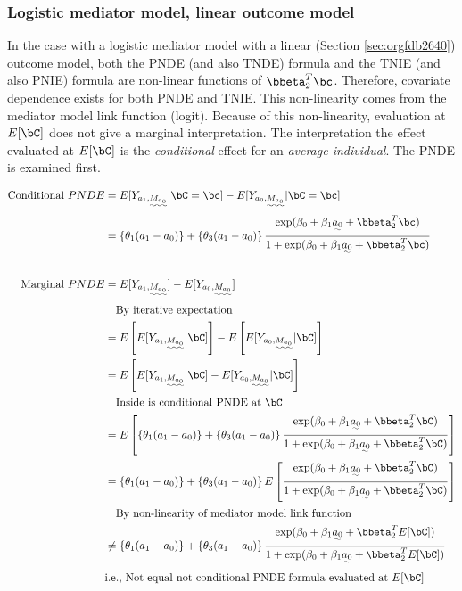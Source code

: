 \documentclass[dvipdfmx,10pt]{article}
\begin{document}
\subsubsection{Logistic mediator model, linear outcome model}
\label{sec:orgb8606b5}
In the case with a logistic mediator model with a linear (Section \ref{sec:orgfdb2640}) outcome model, both the PNDE (and also TNDE) formula and the TNIE (and also PNIE) formula are non-linear functions of \(\bbeta_{2}^{T}\bc\). Therefore, covariate dependence exists for both PNDE and TNIE. This non-linearity comes from the mediator model link function (logit). Because of this non-linearity, evaluation at \(E[\bC]\) does not give a marginal interpretation. The interpretation the effect evaluated at \(E[\bC]\) is the \emph{conditional} effect for an \emph{average individual}. The PNDE is examined first.

\begin{align*}
  \text{Conditional }PNDE
  &= E[Y_{a_{1},\uwave{M_{a_{0}}}} | \bC = \bc] - E[Y_{a_{0},\uwave{M_{a_{0}}}} | \bC = \bc]\\
  &= \left\{\theta_{1}(a_{1} - a_{0}) \right\} + \left\{\theta_{3}(a_{1} - a_{0}) \right\}
    \frac
    {    \exp(\beta_{0} + \beta_{1}\uwave{a_{0}} + \bbeta_{2}^{T}\bc)}
    {1 + \exp(\beta_{0} + \beta_{1}\uwave{a_{0}} + \bbeta_{2}^{T}\bc)}\\
  \\
  \text{Marginal }PNDE
  &= E[Y_{a_{1},\uwave{M_{a_{0}}}}] - E[Y_{a_{0},\uwave{M_{a_{0}}}}]\\
  &~~~\text{By iterative expectation}\\
  &= E \left[ E[Y_{a_{1},\uwave{M_{a_{0}}}} | \bC] \right] - E \left[ E[Y_{a_{0},\uwave{M_{a_{0}}}} | \bC] \right]\\
  &= E \left[ E[Y_{a_{1},\uwave{M_{a_{0}}}} | \bC] - E[Y_{a_{0},\uwave{M_{a_{0}}}} | \bC] \right]\\
  &~~~\text{Inside is conditional PNDE at }\bC\\
  &= E \left[ \left\{\theta_{1}(a_{1} - a_{0}) \right\} + \left\{\theta_{3}(a_{1} - a_{0}) \right\}
    \frac
    {    \exp(\beta_{0} + \beta_{1}\uwave{a_{0}} + \bbeta_{2}^{T}\bC)}
    {1 + \exp(\beta_{0} + \beta_{1}\uwave{a_{0}} + \bbeta_{2}^{T}\bC)} \right]\\
  &= \left\{\theta_{1}(a_{1} - a_{0}) \right\} + \left\{\theta_{3}(a_{1} - a_{0}) \right\}
    E \left[ \frac
    {    \exp(\beta_{0} + \beta_{1}\uwave{a_{0}} + \bbeta_{2}^{T}\bC)}
    {1 + \exp(\beta_{0} + \beta_{1}\uwave{a_{0}} + \bbeta_{2}^{T}\bC)} \right]\\
  &~~~\text{By non-linearity of mediator model link function}\\
  &\ne \left\{\theta_{1}(a_{1} - a_{0}) \right\} + \left\{\theta_{3}(a_{1} - a_{0}) \right\}
    \frac
    {    \exp(\beta_{0} + \beta_{1}\uwave{a_{0}} + \bbeta_{2}^{T}E[\bC])}
    {1 + \exp(\beta_{0} + \beta_{1}\uwave{a_{0}} + \bbeta_{2}^{T}E[\bC])}\\
  &\text{i.e., Not equal not conditional PNDE formula evaluated at }E[\bC]\\
\end{align*}
\end{document}

